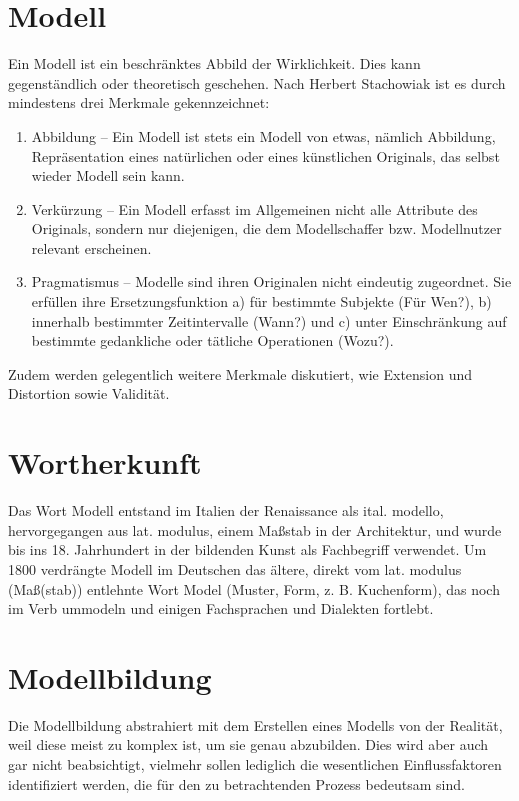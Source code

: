 \documentclass[a4paper, 12pt]{scrartcl}
\begin{document}
\section{Modell}
Ein Modell ist ein beschränktes Abbild der Wirklichkeit. Dies kann gegenständlich oder theoretisch geschehen. Nach Herbert Stachowiak ist es durch mindestens drei Merkmale gekennzeichnet:
\begin{enumerate}
    \item Abbildung – Ein Modell ist stets ein Modell von etwas, nämlich Abbildung, Repräsentation eines natürlichen oder eines künstlichen Originals, das selbst wieder Modell sein kann.
    \item Verkürzung – Ein Modell erfasst im Allgemeinen nicht alle Attribute des Originals, sondern nur diejenigen, die dem Modellschaffer bzw. Modellnutzer relevant erscheinen.
    \item Pragmatismus – Modelle sind ihren Originalen nicht eindeutig zugeordnet. Sie erfüllen ihre Ersetzungsfunktion a) für bestimmte Subjekte (Für Wen?), b) innerhalb bestimmter Zeitintervalle (Wann?) und c) unter Einschränkung auf bestimmte gedankliche oder tätliche Operationen (Wozu?).
\end{enumerate}

Zudem werden gelegentlich weitere Merkmale diskutiert, wie Extension und Distortion sowie Validität.

\tableofcontents

\section{Wortherkunft}

Das Wort Modell entstand im Italien der Renaissance als ital. modello, hervorgegangen aus lat. modulus, einem Maßstab in der Architektur, und wurde bis ins 18. Jahrhundert in der bildenden Kunst als Fachbegriff verwendet. Um 1800 verdrängte Modell im Deutschen das ältere, direkt vom lat. modulus (Maß(stab)) entlehnte Wort Model (Muster, Form, z. B. Kuchenform), das noch im Verb ummodeln und einigen Fachsprachen und Dialekten fortlebt.

\section{Modellbildung}

Die Modellbildung abstrahiert mit dem Erstellen eines Modells von der Realität, weil diese meist zu komplex ist, um sie genau abzubilden. Dies wird aber auch gar nicht beabsichtigt, vielmehr sollen lediglich die wesentlichen Einflussfaktoren identifiziert werden, die für den zu betrachtenden Prozess bedeutsam sind.
\end{document}

